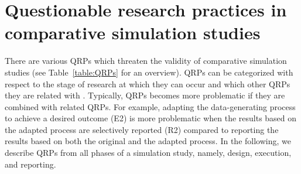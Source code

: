 \documentclass[a4paper, 11pt]{article}
\begin{document}
\section{Questionable research practices in comparative simulation studies} \label{sec:QRP} 

There are various QRPs which threaten the validity of comparative simulation 
studies (see Table~\ref{table:QRPs} for an overview). QRPs can be categorized
with respect to the stage of research at which they can occur and which other 
QRPs they are related with \citep{Wicherts2016}. Typically, QRPs becomes more 
problematic if they are combined with related QRPs. For example, adapting the 
data-generating process to achieve a desired outcome (E2) is more problematic 
when the results based on the adapted process are selectively reported (R2)
compared to reporting the results based on both the original and the adapted 
process. In the following, we describe QRPs from all phases of a simulation
study, namely, design, execution, and reporting.
\end{document}
